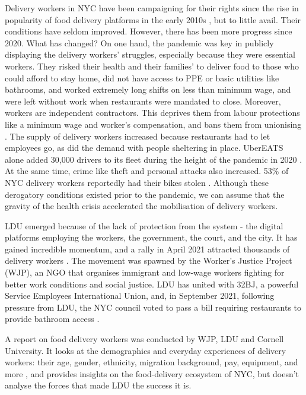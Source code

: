 \documentclass{article}[12pt]
\begin{document}
Delivery workers in NYC have been campaigning for their rights since the rise in popularity of food delivery platforms in the early 2010s \parencite{nytimes2014apps}, but to little avail. Their conditions have seldom improved. However, there has been more progress since 2020. What has changed? On one hand, the pandemic was key in publicly displaying the delivery workers’ struggles, especially because they were essential workers. 
They risked their health and their families’ to deliver food to those who could afford to stay home, did not have access to PPE or basic utilities like bathrooms, and worked extremely long shifts on less than minimum wage, and were left without work when restaurants were mandated to close. 
Moreover, workers are independent contractors. This deprives them from labour protections like a minimum wage and worker’s compensation, and bans them from unionising \parencite{dunn2019hustle}.
The supply of delivery workers increased because restaurants had to let employees go, as did the demand with people sheltering in place. UberEATS alone added 30,000 drivers to its fleet during the height of the pandemic in 2020 \parencite{ldu_report2021}. At the same time, crime like theft and personal attacks also increased. 53\% of NYC delivery workers reportedly had their bikes stolen \parencite{brictv}.
Although these derogatory conditions existed prior to the pandemic, we can assume that the gravity of the health crisis accelerated the mobilisation of delivery workers.

LDU emerged because of the lack of protection from the system \parencite{lee2018delivering} - the digital platforms employing the workers, the government, the court, and the city. It has gained incredible momentum, and a rally in April 2021 attracted thousands of delivery workers \parencite{aponte_2021}. The movement was spawned by the Worker’s Justice Project (WJP), an NGO that organises immigrant and low-wage workers fighting for better work conditions and social justice. 
LDU has united with 32BJ, a powerful Service Employees International Union, and, in September 2021, following pressure from LDU, the NYC council voted to pass a bill requiring restaurants to provide bathroom access \parencite{vice2021bathroom}.

A report on food delivery workers was conducted by WJP, LDU and Cornell University. It looks at the demographics and everyday experiences of delivery workers: their age, gender, ethnicity, migration background, pay, equipment, and more \parencite{ldu_report2021}, and provides insights on the food-delivery ecosystem of NYC, but doesn’t analyse the forces that made LDU the success it is.
\end{document}
